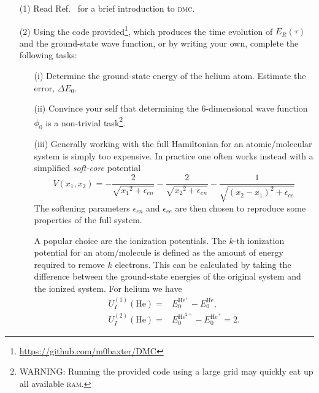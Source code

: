 \documentclass[letterpaper, 11 pt]{article}
\begin{document}
\begin{itemize}

   \item[(1)] Read Ref.~\cite{dmc} for a brief introduction to \textsc{dmc}.

   \item[(2)] Using the code provided\footnote{\href{https://github.com/m0baxter/DMC}
      {https://github.com/m0baxter/DMC}}, which produces the time evolution of $E_R(\tau)$ and the
      ground-state wave function, or by writing your own, complete the following tasks:

      \begin{itemize}

         \item[(i)] Determine the ground-state energy of the helium atom. Estimate the error,
            $\Delta E_0$.

         \item[(ii)] Convince your self that determining the 6-dimensional wave function $\phi_0$
            is a non-trivial task\footnote{WARNING: Running the provided code using a large grid
            may quickly eat up all available \textsc{ram}.}.

         \item[(iii)] Generally working with the full Hamiltonian for an atomic/molecular system is
            simply too expensive. In practice one often works instead with a simplified \emph{soft-core}
            potential
            \begin{equation}
               V(x_1, x_2) = -\frac{2}{\sqrt{{x_1}^2 + \epsilon_{en}}}
                             -\frac{2}{\sqrt{{x_2}^2 + \epsilon_{en}}}
                             -\frac{1}{\sqrt{(x_2 - x_1)^2 + \epsilon_{ee}}}
            \end{equation}
            The softening parameters $\epsilon_{en}$ and $\epsilon_{ee}$ are then chosen to reproduce
            some properties of the full system.

            A popular choice are the ionization potentials. The $k$-th ionization potential for an
            atom/molecule is defined as the amount of energy required to remove $k$ electrons. This can
            be calculated by taking the difference between the ground-state energies of the original
            system and the ionized system. For helium we have
            \begin{align}
               U_I^{(1)}(\mathrm{He}) = & E_0^{\mathrm{He}^+} - E_0^{\mathrm{He}}, \\
               U_I^{(2)}(\mathrm{He}) = & E_0^{\mathrm{He}^{2+}} - E_0^{\mathrm{He}^+} = 2.
            \end{align}


\end{itemize}
\end{itemize}
\end{document}
